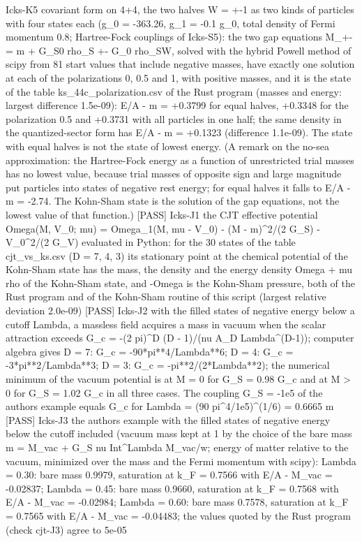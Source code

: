 \documentclass[
  10pt,
]{article}
\newenvironment{Shaded}{}{}
\newcommand{\NormalTok}[1]{#1}
\begin{document}
\begin{Shaded}
\begin{Highlighting}[]
\NormalTok{[PASS] Icks{-}K5  covariant form on 4+4, the two halves W = +{-}1 as two kinds of particles with four states each (g\_0 = {-}363.26, g\_1 = {-}0.1 g\_0, total density of Fermi momentum 0.8; Hartree{-}Fock couplings of Icks{-}S5): the two gap equations M\_+{-} = m + G\_S0 rho\_S +{-} G\_0 rho\_SW, solved with the hybrid Powell method of scipy from 81 start values that include negative masses, have exactly one solution at each of the polarizations 0, 0.5 and 1, with positive masses, and it is the state of the table ks\_44c\_polarization.csv of the Rust program (masses and energy: largest difference 1.5e{-}09): E/A {-} m = +0.3799 for equal halves, +0.3348 for the polarization 0.5 and +0.3731 with all particles in one half; the same density in the quantized{-}sector form has E/A {-} m = +0.1323 (difference 1.1e{-}09). The state with equal halves is not the state of lowest energy. (A remark on the no{-}sea approximation: the Hartree{-}Fock energy as a function of unrestricted trial masses has no lowest value, because trial masses of opposite sign and large magnitude put particles into states of negative rest energy; for equal halves it falls to E/A {-} m = {-}2.74. The Kohn{-}Sham state is the solution of the gap equations, not the lowest value of that function.)}
\NormalTok{[PASS] Icks{-}J1  the CJT effective potential Omega(M, V\_0; mu) = Omega\_1(M, mu {-} V\_0) {-} (M {-} m)\^{}2/(2 G\_S) {-} V\_0\^{}2/(2 G\_V) evaluated in Python: for the 30 states of the table cjt\_vs\_ks.csv (D = 7, 4, 3) its stationary point at the chemical potential of the Kohn{-}Sham state has the mass, the density and the energy density Omega + mu rho of the Kohn{-}Sham state, and {-}Omega is the Kohn{-}Sham pressure, both of the Rust program and of the Kohn{-}Sham routine of this script (largest relative deviation 2.0e{-}09)}
\NormalTok{[PASS] Icks{-}J2  with the filled states of negative energy below a cutoff Lambda, a massless field acquires a mass in vacuum when the scalar attraction exceeds G\_c = {-}(2 pi)\^{}D (D {-} 1)/(nu A\_D Lambda\^{}(D{-}1)); computer algebra gives D = 7: G\_c = {-}90*pi**4/Lambda**6; D = 4: G\_c = {-}3*pi**2/Lambda**3; D = 3: G\_c = {-}pi**2/(2*Lambda**2); the numerical minimum of the vacuum potential is at M = 0 for G\_S = 0.98 G\_c and at M \textgreater{} 0 for G\_S = 1.02 G\_c in all three cases. The coupling G\_S = {-}1e5 of the author\textquotesingle{}s example equals G\_c for Lambda = (90 pi\^{}4/1e5)\^{}(1/6) = 0.6665 m}
\NormalTok{[PASS] Icks{-}J3  the author\textquotesingle{}s example with the filled states of negative energy below the cutoff included (vacuum mass kept at 1 by the choice of the bare mass m = M\_vac + G\_S nu Int\^{}Lambda M\_vac/w; energy of matter relative to the vacuum, minimized over the mass and the Fermi momentum with scipy): Lambda = 0.30: bare mass 0.9979, saturation at k\_F = 0.7566 with E/A {-} M\_vac = {-}0.02837; Lambda = 0.45: bare mass 0.9660, saturation at k\_F = 0.7568 with E/A {-} M\_vac = {-}0.02984; Lambda = 0.60: bare mass 0.7578, saturation at k\_F = 0.7565 with E/A {-} M\_vac = {-}0.04483; the values quoted by the Rust program (check cjt{-}J3) agree to 5e{-}05}

\end{Highlighting}
\end{Shaded}
\end{document}
